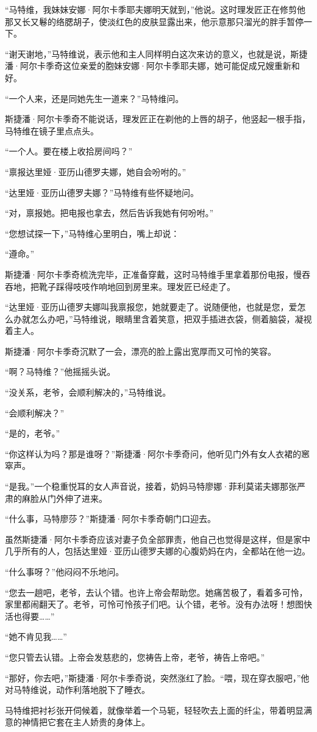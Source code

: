 \par “马特维，我妹妹安娜·阿尔卡季耶夫娜明天就到，”他说。这时理发匠正在修剪他那又长又鬈的络腮胡子，使淡红色的皮肤显露出来，他示意那只溜光的胖手暂停一下。
\par “谢天谢地，”马特维说，表示他和主人同样明白这次来访的意义，也就是说，斯捷潘·阿尔卡季奇这位亲爱的胞妹安娜·阿尔卡季耶夫娜，她可能促成兄嫂重新和好。
\par “一个人来，还是同她先生一道来？”马特维问。
\par 斯捷潘·阿尔卡季奇不能说话，理发匠正在剃他的上唇的胡子，他竖起一根手指，马特维在镜子里点点头。
\par “一个人。要在楼上收拾房间吗？”
\par “禀报达里娅·亚历山德罗夫娜，她自会吩咐的。”
\par “达里娅·亚历山德罗夫娜？”马特维有些怀疑地问。
\par “对，禀报她。把电报也拿去，然后告诉我她有何吩咐。”
\par “您想试探一下，”马特维心里明白，嘴上却说：
\par “遵命。”
\par 斯捷潘·阿尔卡季奇梳洗完毕，正准备穿戴，这时马特维手里拿着那份电报，慢吞吞地，把靴子踩得吱吱作响地回到房里来。理发匠已经走了。
\par “达里娅·亚历山德罗夫娜叫我禀报您，她就要走了。说随便他，也就是您，爱怎么办就怎么办吧，”马特维说，眼睛里含着笑意，把双手插进衣袋，侧着脑袋，凝视着主人。
\par 斯捷潘·阿尔卡季奇沉默了一会，漂亮的脸上露出宽厚而又可怜的笑容。
\par “啊？马特维？”他摇摇头说。
\par “没关系，老爷，会顺利解决的，”马特维说。
\par “会顺利解决？”
\par “是的，老爷。”
\par “你这样认为吗？那是谁呀？”斯捷潘·阿尔卡季奇问，他听见门外有女人衣裙的窸窣声。
\par “是我。”一个稳重悦耳的女人声音说，接着，奶妈马特廖娜·菲利莫诺夫娜那张严肃的麻脸从门外伸了进来。
\par “什么事，马特廖莎？”斯捷潘·阿尔卡季奇朝门口迎去。
\par 虽然斯捷潘·阿尔卡季奇应该对妻子负全部罪责，他自己也觉得是这样，但是家中几乎所有的人，包括达里娅·亚历山德罗夫娜的心腹奶妈在内，全都站在他一边。
\par “什么事呀？”他闷闷不乐地问。
\par “您去一趟吧，老爷，去认个错。也许上帝会帮助您。她痛苦极了，看着多可怜，家里都闹翻天了。老爷，可怜可怜孩子们吧。认个错，老爷。没有办法呀！想图快活也得要……”
\par “她不肯见我……”
\par “您只管去认错。上帝会发慈悲的，您祷告上帝，老爷，祷告上帝吧。”
\par “那好，你去吧，”斯捷潘·阿尔卡季奇说，突然涨红了脸。“喂，现在穿衣服吧，”他对马特维说，动作利落地脱下了睡衣。
\par 马特维把衬衫张开伺候着，就像举着一个马轭，轻轻吹去上面的纤尘，带着明显满意的神情把它套在主人娇贵的身体上。

